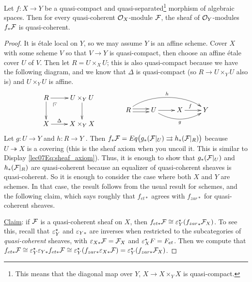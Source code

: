 \begin{proposition} \label{lec15P:q-sep,q-cmpt=>f_*F_qcoh}
   Let $f:X\to Y$ be a quasi-compact and quasi-separated\/\footnote{This means that the
   diagonal map over $Y$, $X\to X\times_Y X$ is quasi-compact.} morphism of algebraic
   spaces. Then for every quasi-coherent $\mathcal{O}_X$-module $\mathcal{F}$, the sheaf of $\mathcal{O}_Y$-modules
   $f_*\mathcal{F}$ is quasi-coherent.
 \end{proposition}
 \begin{proof}
   It is \'etale local on $Y$, so we may assume $Y$ is an affine scheme. Cover $X$ with
   some scheme $V$ so that $V\to Y$ is quasi-compact, then choose an affine \'etale cover
   $U$ of $V$. Then let $R=U\times_X U$; this is also quasi-compact because we have the
   following diagram, and we know that $\Delta$ is quasi-compact (so $R\to U\times_Y U$
   also is) and $U\times_Y U$ is affine.
   \[\xymatrix{
    R \ar[r] \ar[d] \ar@{}[dr]|(.25)\pb & U\times_Y U \ar[d] \\
    X \ar[r]^<>(.5)\Delta & X\times_Y X
   }\qquad\qquad\raisebox{-1.5pc}{$\xymatrix{
    R\ar@<.5ex>[r]\ar@<-.5ex>[r] \ar@(ur,ul)[rrr]^h
    & U\ar[r] \ar@/_3ex/[rr]_g & X\ar[r]^(.4)f & Y
   }$}\]
    Let $g:U\to Y$ and $h:R\to Y$ . Then
   $f_*\mathcal{F}=Eq\bigl(g_* (\mathcal{F}|_U) \rightrightarrows h_*(\mathcal{F}|_R)\bigr)$ because
   $U\twoheadrightarrow X$ is a covering (this is the sheaf axiom when you uncoil it.
   This is similar to Display \ref{lec07Eq:sheaf_axiom}). Thus, it is enough to show that
   $g_*(\mathcal{F}|_U)$ and $h_*(\mathcal{F}|_R)$ are quasi-coherent because an equalizer of
   quasi-coherent sheaves is quasi-coherent. So it is enough to consider the case where
   both $X$ and $Y$ are schemes. In that case, the result follows from the usual result
   for schemes, and the following claim, which says roughly that $f_{et*}$ agrees with
   $f_{zar*}$ for quasi-coherent sheaves.

   \underline{Claim}: if $\mathcal{F}$ is a quasi-coherent sheaf on $X$, then
   $f_{et*}\mathcal{F}\cong\varepsilon^\star_Y({f_{zar}}_* \mathcal{F}_X)$. To see this, recall that
   $\varepsilon_{Y}^\star$ and $\varepsilon_{Y*}$ are inverses when restricted to the subcategories of
   \emph{quasi-coherent} sheaves, with $\varepsilon_{X*}\mathcal{F}=\mathcal{F}_X$ and $\varepsilon_X^\star F=F_{et}$. Then
   we compute that $f_{et*}\mathcal{F} \cong \varepsilon_Y^\star \varepsilon_{Y*}f_{et*}\mathcal{F}\cong \varepsilon_Y^\star
   (f_{zar*}\varepsilon_{X*}\mathcal{F})=\varepsilon_Y^\star (f_{zar*}\mathcal{F}_X)$.
 \end{proof}
